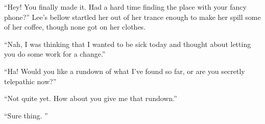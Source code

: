 \documentclass[11pt]{memoir}
\begin{document}
``Hey! You finally made it. Had a hard time finding the place with your fancy phone?'' Lee's bellow startled her out of her trance enough to make her spill some of her coffee, though none got on her clothes.

``Nah, I was thinking that I wanted to be sick today and thought about letting you do some work for a change.''

``Ha! Would you like a rundown of what I've found so far, or are you secretly telepathic now?''

``Not quite yet. How about you give me that rundown.''

``Sure thing. ''

\mainmatter


\backmatter
\end{document}
